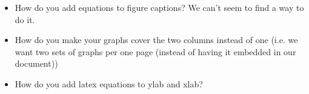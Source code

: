 \documentclass[a4paper, 12pt, journal]{ieeeconf}\usepackage[]{graphicx}\usepackage[]{color}
\begin{document}
\begin{itemize}
\item How do you add equations to figure captions? We can't seem to find a way to do it.
\item How do you make your graphs cover the two columns instead of one (i.e. we want two sets of graphs per one page (instead of having it embedded in our document))
\item How do you add latex equations to ylab and xlab?
\end{itemize}





\end{document}

